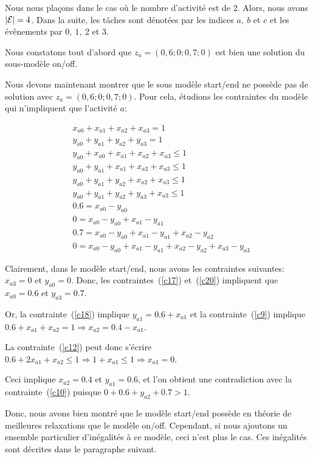 Nous nous plaçons dans le cas où le nombre d'activité est de 2. Alors,
nous avons $|{\cal E}|=4$.  Dans la suite, les tâches sont dénotées par les
indices $a,\ b$ et $c$ et les évênements par $0,\ 1,\ 2$ et $3$.

Nous constatons tout d'abord que $z_a=(0,6;0;0,7;0)$ est bien une
solution du sous-modèle on/off. 

Nous devons maintenant montrer que le sous modèle start/end ne possède
pas de solution avec $z_a=(0,6;0;0,7;0)$. Pour cela, étudions les contraintes du
modèle qui n'impliquent que l'activité $a$:

\begin{align} &x_{a0}+x_{a1}+x_{a2}+x_{a3}= 1 \label{c9}\\
              &y_{a0}+y_{a1}+y_{a2}+y_{a3}= 1 \label{c10}\\
              &y_{a0}+x_{a0}+x_{a1}+x_{a2}+x_{a3}\le1 \label{c11}\\
              &y_{a0}+y_{a1}+x_{a1}+x_{a2}+x_{a3}\le1 \label{c12}\\
              &y_{a0}+y_{a1}+y_{a2}+x_{a2}+x_{a3}\le1 \label{c13}\\
              &y_{a0}+y_{a1}+y_{a2}+y_{a3}+x_{a3}\le1 \label{c14}\\
              &0.6=x_{a0}-y_{a0}\label{c17}\\
              &0=x_{a0}-y_{a0}+x_{a1}-y_{a1}\label{c18}\\
              &0.7=x_{a0}-y_{a0}+x_{a1}-y_{a1}+x_{a2}-y_{a2}\label{c19}\\
              &0=x_{a0}-y_{a0}+x_{a1}-y_{a1}+x_{a2}-y_{a2}+x_{a3}-y_{a3}\label{c20}
\end{align}

Clairement, dans le modèle start/end, nous avons les contraintes
suivantes: $x_{a3}=0$ et $y_{a0}=0$. Donc, les contraintes~(\ref{c17})
et~(\ref{c20}) impliquent que $x_{a0}=0.6$ et $y_{a3}=0.7$. 

Or, la contrainte~(\ref{c18}) implique $y_{a1}=0.6+x_{a1}$
et la contrainte~(\ref{c9}) implique $0.6+x_{a1}+x_{a2}=1 \Rightarrow
x_{a2}=0.4-x_{a1}$. 

La contrainte~(\ref{c12}) peut donc s'écrire
$0.6+2x_{a1}+x_{a2}\le 1 \Rightarrow 1+x_{a1}\le 1 \Rightarrow
x_{a1}=0$. 

Ceci implique $x_{a2}=0.4$ et $y_{a1}=0.6$, et l'on obtient
une contradiction avec la contrainte~(\ref{c10}) puisque $0+0.6+y_{a2}+0.7>1$.

Donc, nous avons bien montré que le modèle start/end possède en
théorie de meilleures relaxations que le modèle on/off. Cependant, si
nous ajoutons un ensemble particulier d'inégalités à ce modèle, ceci
n'est plus le cas. Ces inégalités sont décrites dans le paragraphe
suivant.


